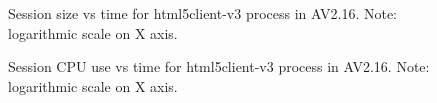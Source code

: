 \documentclass{article}
\begin{document}
\begin{figure}[H]
        \caption{\label{FIGURE-AV216htmlSizeVsTime} Session size vs time for html5client-v3 process in AV2.16. Note: logarithmic scale on X axis.}
\end{figure}

\begin{figure}[H]
        \caption{\label{FIGURE-AV216htmlCPUVsTime} Session CPU use vs time for html5client-v3 process in AV2.16. Note: logarithmic scale on X axis.}
\end{figure}
\end{document}
